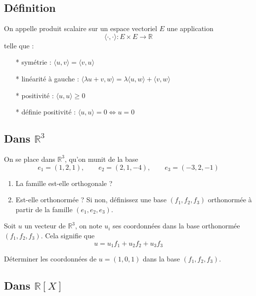\subsection{Définition}
On appelle produit scalaire sur un espace vectoriel $E$ une application 
$$\langle \cdot, \cdot \rangle : E \times E \to \mathbb{R}$$
telle que :
\begin{multicols}{2}
\begin{itemize}
    \item[*] symétrie : $\langle u, v \rangle = \langle v, u \rangle$ 
    \item[*] linéarité à gauche : $\langle \lambda u + v, w \rangle = \lambda \langle u, w \rangle + \langle v, w \rangle$
    \item[*] positivité : $\langle u, u \rangle \geq 0$
    \item[*] définie positivité : $\langle u, u \rangle = 0 \iff u = 0$
\end{itemize}
\end{multicols}


\vspace{1em}

\subsection{Dans $\mathbb{R}^3$}

On se place dans $\mathbb{R}^3$, qu'on munit de la base 
$$e_1 = (1,2,1), \qquad e_2 = (2,1,-4), \qquad e_3 = (-3,2,-1)$$

\begin{enumerate}
\item La famille est-elle orthogonale ? 
\item Est-elle orthonormée ? Si non, définissez une base $(f_1,f_2,f_3)$ orthonormée à partir de la famille $(e_1,e_2,e_3)$. 
\end{enumerate}

Soit $u$ un vecteur de $\mathbb{R}^3$, on note $u_i$ ses coordonnées dans la base orthonormée $(f_1,f_2,f_3)$. Cela signifie que 
$$u = u_1 f_1 + u_2 f_2 + u_3 f_3$$

Déterminer les coordonnées de $u = (1,0,1)$ dans la base $(f_1,f_2,f_3)$.

\vspace{1em}

\subsection{Dans $\mathbb{R}[X]$}

